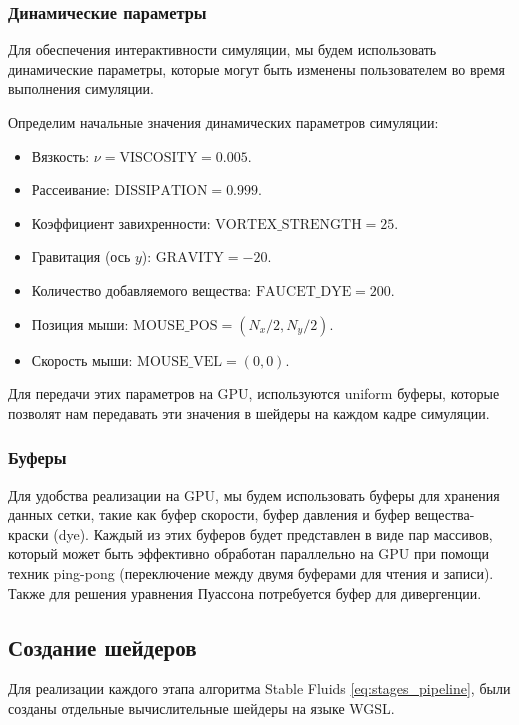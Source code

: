 \subsubsection{Динамические параметры}

Для обеспечения интерактивности симуляции, мы будем использовать динамические параметры, которые могут быть изменены пользователем во время выполнения симуляции.

Определим начальные значения динамических параметров симуляции:

\begin{itemize}
    \item Вязкость: $\nu=\text{VISCOSITY}=0.005$.
    \item Рассеивание: $\text{DISSIPATION}=0.999$.
    \item Коэффициент завихренности: $\text{VORTEX\_STRENGTH}=25$.
    \item Гравитация (ось $y$): $\text{GRAVITY}=-20$.
    \item Количество добавляемого вещества: $\text{FAUCET\_DYE}=200$.
    \item Позиция мыши: $\text{MOUSE\_POS}=(N_x/2,N_y/2)$.
    \item Скорость мыши: $\text{MOUSE\_VEL}=(0,0)$.
\end{itemize}

Для передачи этих параметров на GPU, используются uniform буферы, которые позволят нам передавать эти значения в шейдеры на каждом кадре симуляции.

\subsubsection{Буферы}

Для удобства реализации на GPU, мы будем использовать буферы для хранения данных сетки, такие как буфер скорости, буфер давления и буфер вещества-краски (dye). Каждый из этих буферов будет представлен в виде пар массивов, который может быть эффективно обработан параллельно на GPU при помощи техник ping-pong (переключение между двумя буферами для чтения и записи). Также для решения уравнения Пуассона потребуется буфер для дивергенции.



\subsection{Создание шейдеров}

Для реализации каждого этапа алгоритма Stable Fluids \eqref{eq:stages_pipeline}, были созданы отдельные вычислительные шейдеры на языке WGSL.

